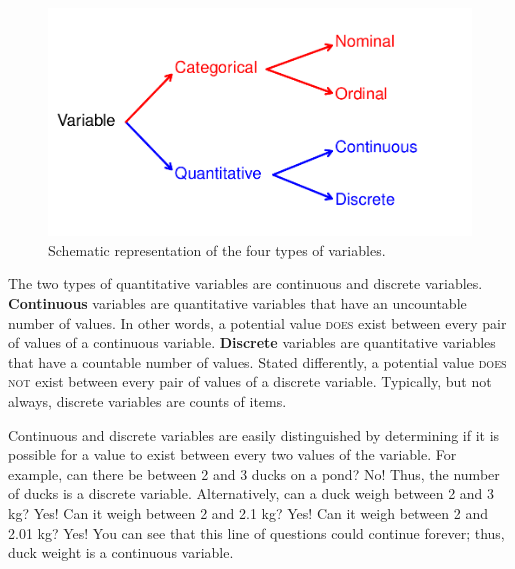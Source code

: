 \documentclass[10pt,openany]{book}\usepackage[]{graphicx}\usepackage[]{color}
\newenvironment{knitrout}{}{} %
\begin{document}
\begin{knitrout}
\color{fgcolor}\begin{figure}[hbtp]

{\centering \includegraphics[width=.5\linewidth]{Figs/VarTypes-1} 

}

\caption[Schematic representation of the four types of variables]{Schematic representation of the four types of variables.}\label{fig:VarTypes}
\end{figure}


\end{knitrout}
\vspace{9pt} %

The two types of quantitative variables are continuous and discrete variables.  \textbf{Continuous} variables are quantitative variables that have an uncountable number of values.  In other words, a potential value \textsc{does} exist between every pair of values of a continuous variable.  \textbf{Discrete} variables are quantitative variables that have a countable number of values.  Stated differently, a potential value \textsc{does not} exist between every pair of values of a discrete variable.  Typically, but not always, discrete variables are counts of items.

Continuous and discrete variables are easily distinguished by determining if it is possible for a value to exist between every two values of the variable.  For example, can there be between 2 and 3 ducks on a pond?  No!  Thus, the number of ducks is a discrete variable.  Alternatively, can a duck weigh between 2 and 3 kg?  Yes!  Can it weigh between 2 and 2.1 kg?  Yes!  Can it weigh between 2 and 2.01 kg?  Yes!  You can see that this line of questions could continue forever; thus, duck weight is a continuous variable.


\vspace{-12pt}
\end{document}
